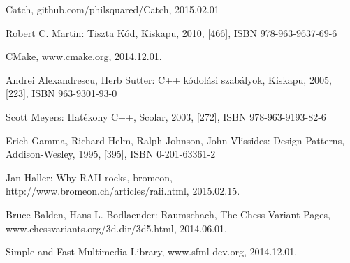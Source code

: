\documentclass[12pt, twoside]{report}
\begin{document}
\begin{thebibliography}{CMake}
	 Catch, github.com/philsquared/Catch, 2015.02.01
			
	 Robert C. Martin: Tiszta Kód, Kiskapu, 2010, [466], ISBN 978-963-9637-69-6

	 CMake, www.cmake.org, 2014.12.01.
	
	 Andrei Alexandrescu, Herb Sutter: C++ kódolási szabályok, Kiskapu, 2005, [223], ISBN 963-9301-93-0
	
	 Scott Meyers: Hatékony C++, Scolar, 2003, [272], ISBN 978-963-9193-82-6
	
	 Erich Gamma, Richard Helm, Ralph Johnson, John Vlissides: Design Patterns, Addison-Wesley, 1995, [395], ISBN 0-201-63361-2
	
	 Jan Haller: Why RAII rocks, bromeon, http://www.bromeon.ch/articles/raii.html, 2015.02.15.
	
	 Bruce Balden, Hans L. Bodlaender: Raumschach, The Chess Variant Pages, www.chessvariants.org/3d.dir/3d5.html, 2014.06.01.
		
	 Simple and Fast Multimedia Library, www.sfml-dev.org, 2014.12.01.
\end{thebibliography}
\end{document}
